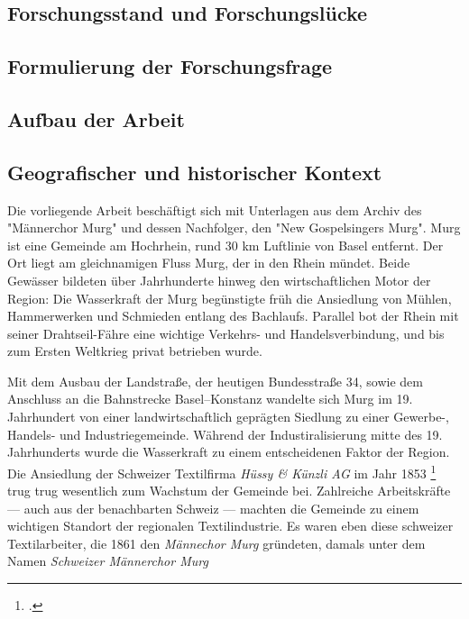 \documentclass[12pt, a4paper, ngerman, bidi=default]{article}
\renewcommand{\cite}{\footcite}
\begin{document}
\subsection{Forschungsstand und Forschungslücke}
\subsection{Formulierung der Forschungsfrage}
\subsection{Aufbau der Arbeit}
\subsection{Geografischer und historischer Kontext}
Die vorliegende Arbeit beschäftigt sich mit Unterlagen aus dem Archiv des "Männerchor Murg" und dessen Nachfolger, den "New Gospelsingers Murg". Murg ist eine Gemeinde am Hochrhein, rund 30 km Luftlinie von Basel entfernt.
Der Ort liegt am gleichnamigen Fluss Murg, der in den Rhein mündet. Beide Gewässer bildeten über Jahrhunderte hinweg den wirtschaftlichen Motor der Region: Die Wasserkraft der Murg begünstigte 
früh die Ansiedlung von Mühlen, Hammerwerken und Schmieden entlang des Bachlaufs. Parallel bot der Rhein mit seiner Drahtseil-Fähre 
eine wichtige Verkehrs- und Handelsverbindung, und bis zum Ersten Weltkrieg privat betrieben wurde.

Mit dem Ausbau der Landstraße, der heutigen Bundesstraße 34, sowie dem Anschluss an die Bahnstrecke Basel–Konstanz wandelte sich Murg im 19. Jahrhundert 
von einer landwirtschaftlich geprägten Siedlung zu einer Gewerbe-, Handels- und Industriegemeinde. Während der Industiralisierung mitte des 19. Jahrhunderts wurde die Wasserkraft zu einem entscheidenen Faktor der Region. Die Ansiedlung der Schweizer Textilfirma 
\textit{Hüssy \& Künzli AG} im Jahr 1853 \cite[vgl.][]{gemeinde_murg_geschichte_nodate} trug trug wesentlich zum Wachstum der Gemeinde bei. Zahlreiche Arbeitskräfte — auch aus der benachbarten Schweiz — machten die Gemeinde zu einem wichtigen
Standort der regionalen Textilindustrie. Es waren eben diese schweizer Textilarbeiter, die 1861 den \textit{Männechor Murg} gründeten, damals unter dem Namen \textit{Schweizer Männerchor Murg}

  

  \newpage
\end{document}

